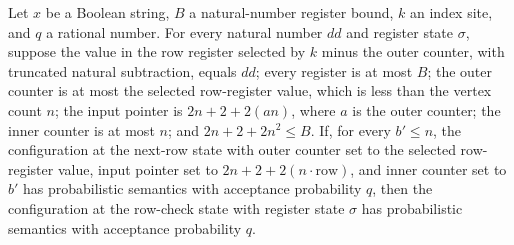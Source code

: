 \begin{lemma}
\label{Complexity.LogProg.ups_row}
\leanok
{}
Let $x$ be a Boolean string, $B$ a natural-number register bound, $k$ an index site, and
$q$ a rational number. For every natural number $dd$ and register state $\sigma$,
suppose the value in the row register selected by $k$ minus the outer counter, with
truncated natural subtraction, equals $dd$; every register is at most $B$; the outer
counter is at most the selected row-register value, which is less than the vertex count
$n$; the input pointer is $2n+2+2(an)$, where $a$ is the outer counter; the inner
counter is at most $n$; and $2n+2+2n^2\le B$. If, for every $b'\le n$, the configuration
at the next-row state with outer counter set to the selected row-register value, input
pointer set to $2n+2+2(n\cdot\mathrm{row})$, and inner counter set to $b'$ has
probabilistic semantics with acceptance probability $q$, then the configuration at the
row-check state with register state $\sigma$ has probabilistic semantics with acceptance
probability $q$.
\end{lemma}

